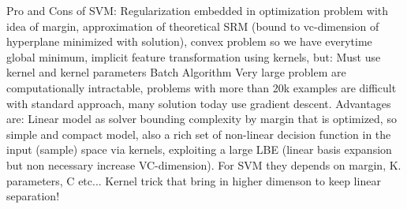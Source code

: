 \documentclass[12pt]{book}
\begin{document}
Pro and Cons of SVM: Regularization embedded in optimization problem with idea of margin, approximation of theoretical SRM (bound to vc-dimension of hyperplane minimized with solution), convex problem so we have everytime global minimum, implicit feature transformation using kernels, but:\newline
Must use kernel and kernel parameters\newline
Batch Algorithm
Very large problem are computationally intractable, problems with more than 20k examples are difficult with standard approach, many solution today use gradient descent.
Advantages are: Linear model as solver bounding complexity by margin that is optimized, so simple and  compact model, also a rich set of non-linear decision function in the input (sample) space via kernels, exploiting a large LBE (linear basis expansion but non necessary increase VC-dimension). For SVM they depends on margin, K. parameters, C etc...\newline
Kernel trick that bring in higher dimenson to keep linear separation!
\end{document}
